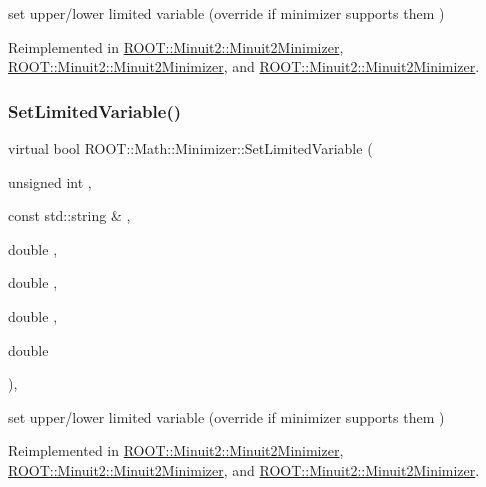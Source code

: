 set upper/lower limited variable (override if minimizer supports them ) 



Reimplemented in \mbox{\hyperlink{classROOT_1_1Minuit2_1_1Minuit2Minimizer_a30385295df6a6b784aa59de7f00e4d23}{R\+O\+O\+T\+::\+Minuit2\+::\+Minuit2\+Minimizer}}, \mbox{\hyperlink{classROOT_1_1Minuit2_1_1Minuit2Minimizer_a30385295df6a6b784aa59de7f00e4d23}{R\+O\+O\+T\+::\+Minuit2\+::\+Minuit2\+Minimizer}}, and \mbox{\hyperlink{classROOT_1_1Minuit2_1_1Minuit2Minimizer_a30385295df6a6b784aa59de7f00e4d23}{R\+O\+O\+T\+::\+Minuit2\+::\+Minuit2\+Minimizer}}.

\mbox{\label{classROOT_1_1Math_1_1Minimizer_a4303530cbb62ceb7cf9c9ebcbde530c2}} 
\subsubsection{\texorpdfstring{SetLimitedVariable()}{SetLimitedVariable()}\hspace{0.1cm}{\footnotesize\ttfamily [2/3]}}
{\footnotesize\ttfamily virtual bool R\+O\+O\+T\+::\+Math\+::\+Minimizer\+::\+Set\+Limited\+Variable (\begin{DoxyParamCaption}\item[{unsigned int}]{,  }\item[{const std\+::string \&}]{,  }\item[{double}]{,  }\item[{double}]{,  }\item[{double}]{,  }\item[{double}]{ }\end{DoxyParamCaption})\hspace{0.3cm}{\ttfamily [inline]}, {\ttfamily [virtual]}}



set upper/lower limited variable (override if minimizer supports them ) 



Reimplemented in \mbox{\hyperlink{classROOT_1_1Minuit2_1_1Minuit2Minimizer_a30385295df6a6b784aa59de7f00e4d23}{R\+O\+O\+T\+::\+Minuit2\+::\+Minuit2\+Minimizer}}, \mbox{\hyperlink{classROOT_1_1Minuit2_1_1Minuit2Minimizer_a30385295df6a6b784aa59de7f00e4d23}{R\+O\+O\+T\+::\+Minuit2\+::\+Minuit2\+Minimizer}}, and \mbox{\hyperlink{classROOT_1_1Minuit2_1_1Minuit2Minimizer_a30385295df6a6b784aa59de7f00e4d23}{R\+O\+O\+T\+::\+Minuit2\+::\+Minuit2\+Minimizer}}.

